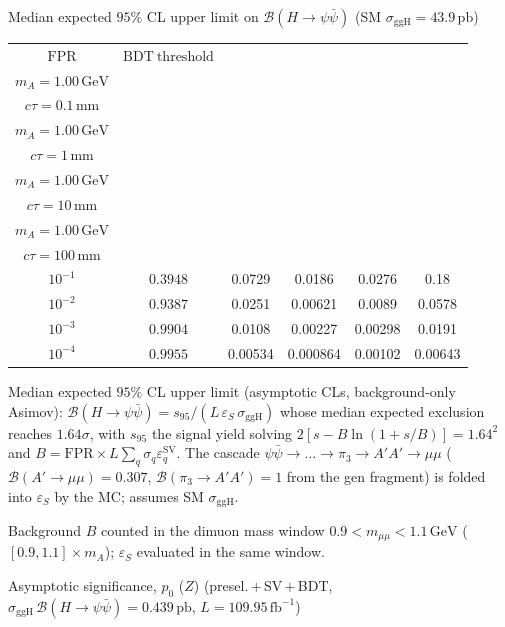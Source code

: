 \documentclass[10pt,a4paper]{article}
\begin{document}
{\vspace{12pt}

Median expected $95\%$ CL upper limit on $\mathcal{B}(H\to\psi\bar{\psi})$ (SM $\sigma_{\mathrm{ggH}}=43.9\,\mathrm{pb}$)

\begin{tabular}{cccccc}
\toprule
$\mathrm{FPR}$ & $\mathrm{BDT\ threshold}$ & \shortstack{$m_{\pi}=10\,\mathrm{GeV}$\\$m_{A}=1.00\,\mathrm{GeV}$\\$c\tau=0.1\,\mathrm{mm}$} & \shortstack{$m_{\pi}=10\,\mathrm{GeV}$\\$m_{A}=1.00\,\mathrm{GeV}$\\$c\tau=1\,\mathrm{mm}$} & \shortstack{$m_{\pi}=10\,\mathrm{GeV}$\\$m_{A}=1.00\,\mathrm{GeV}$\\$c\tau=10\,\mathrm{mm}$} & \shortstack{$m_{\pi}=10\,\mathrm{GeV}$\\$m_{A}=1.00\,\mathrm{GeV}$\\$c\tau=100\,\mathrm{mm}$} \\
\midrule
$10^{-1}$ & $0.3948$ & 0.0729 & 0.0186 & 0.0276 & 0.18\\
$10^{-2}$ & $0.9387$ & 0.0251 & 0.00621 & 0.0089 & 0.0578\\
$10^{-3}$ & $0.9904$ & 0.0108 & 0.00227 & 0.00298 & 0.0191\\
$10^{-4}$ & $0.9955$ & 0.00534 & 0.000864 & 0.00102 & 0.00643\\
\bottomrule
\end{tabular}

{\small Median expected $95\%$ CL upper limit (asymptotic CLs, background-only Asimov): $\mathcal{B}(H\to\psi\bar{\psi})=s_{95}/(L\,\varepsilon_S\,\sigma_{\mathrm{ggH}})$ whose median expected exclusion reaches $1.64\sigma$, with $s_{95}$ the signal yield solving $2[s-B\ln(1{+}s/B)]=1.64^2$ and $B=\mathrm{FPR}\times L\sum_q\sigma_q\varepsilon_q^{\mathrm{SV}}$. The cascade $\psi\bar{\psi}\to\ldots\to\pi_3\to A'A'\to\mu\mu$ ($\mathcal{B}(A'\to\mu\mu)=0.307$, $\mathcal{B}(\pi_3\to A'A')=1$ from the gen fragment) is folded into $\varepsilon_S$ by the MC; assumes SM $\sigma_{\mathrm{ggH}}$.}

{\small Background $B$ counted in the dimuon mass window $0.9<m_{\mu\mu}<1.1\,\mathrm{GeV}$ ($[0.9,1.1]\times m_A$); $\varepsilon_S$ evaluated in the same window.}

\vspace{12pt}

Asymptotic significance, $p_0$ ($Z$) (presel.\,$+$\,SV\,$+$\,BDT, $\sigma_{\mathrm{ggH}}\,\mathcal{B}(H\to\psi\bar{\psi})=0.439\,\mathrm{pb}$, $L=109.95\,\mathrm{fb}^{-1}$)

}
\end{document}
